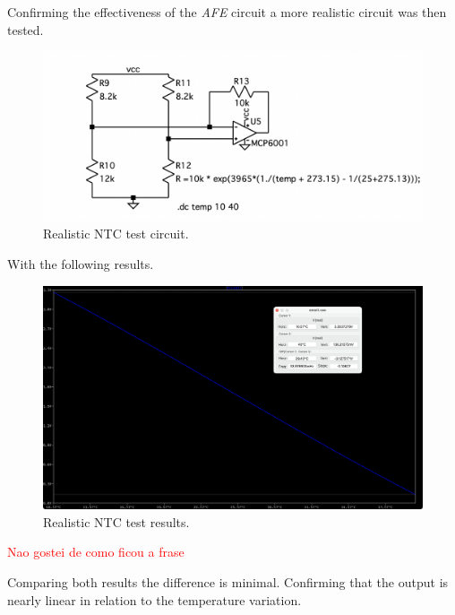 \documentclass[12pt]{article}
\begin{document}
    Confirming the effectiveness of the \textit{AFE} circuit a more realistic
    circuit was then tested.

    \begin{figure}[H] 
        \centering
        \includegraphics*[scale = 0.45]{images/NTCRealTb.png}
        \caption{Realistic NTC test circuit.}
        \label{wrap-fig:1}
    \end{figure}
    
    With the following results.
    
    \begin{figure}[H] 
        \centering
        \includegraphics*[scale = 0.3]{images/NTCRealRes.png}
        \caption{Realistic NTC test results.}
        \label{wrap-fig:1}
    \end{figure}

    \textcolor{red}{Nao gostei de como ficou a frase }
    
    Comparing both results the difference is minimal.
    Confirming that the output is nearly linear in relation to the temperature variation.
    
\end{document}
